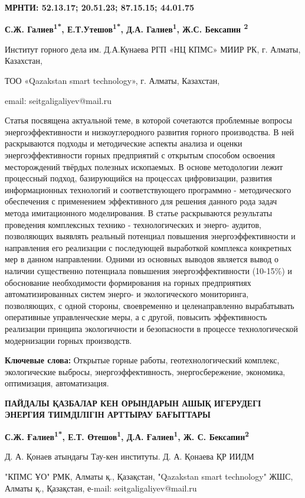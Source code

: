 \clearpage
{\bfseries МРНТИ: 52.13.17; 20.51.23; 87.15.15; 44.01.75}


\begin{center}
{\bfseries С.Ж. Галиев\textsuperscript{1*}, Е.Т.Утешов\textsuperscript{1*},
Д.А. Галиев\textsuperscript{1}, Ж.С. Бексапин \textsuperscript{2}}

Институт горного дела им. Д.А.Кунаева РГП «НЦ КПМС» МИИР РК, г. Алматы,
Казахстан,

ТОО «Qazakstan smart technology», г. Алматы, Казахстан,

email: seitgaligaliyev@mail.ru
\end{center}

Статья посвящена актуальной теме, в которой сочетаются проблемные
вопросы энергоэффективности и низкоуглеродного развития горного
производства. В ней раскрываются подходы и методические аспекты анализа
и оценки энергоэффективности горных предприятий с открытым способом
освоения месторождений твёрдых полезных ископаемых. В основе методологии
лежит процессный подход, базирующийся на процессах цифровизации,
развития информационных технологий и соответствующего
программно - методического обеспечения с применением эффективного для
решения данного рода задач метода имитационного моделирования. В статье
раскрываются результаты проведения комплексных технико - технологических и
энерго- аудитов, позволяющих выявлять реальный потенциал повышения
энергоэффективности и направления его реализации с последующей
выработкой комплекса конкретных мер в данном направлении. Одними из
основных выводов является вывод о наличии существенно потенциала
повышения энергоэффективности (10-15\%) и обоснование необходимости
формирования на горных предприятиях автоматизированных систем энерго- и
экологического мониторинга, позволяющих, с одной стороны, своевременно и
целенаправленно вырабатывать оперативные управленческие меры, а с
другой, повысить эффективность реализации принципа экологичности и
безопасности в процессе технологической модернизации горных производств.

{\bfseries Ключевые слова:} Открытые горные работы, геотехнологический
комплекс, экологические выбросы, энергоэффективность, энергосбережение, экономика,
оптимизация, автоматизация.

\begin{center}
{\large\bfseries ПАЙДАЛЫ ҚАЗБАЛАР КЕН ОРЫНДАРЫН АШЫҚ ИГЕРУДЕГІ ЭНЕРГИЯ
ТИІМДІЛІГІН АРТТЫРАУ БАҒЫТТАРЫ}

{\bfseries С.Ж. Ғалиев\textsuperscript{1*}, Е.Т. Өтешов\textsuperscript{1},
Д.А. Ғалиев\textsuperscript{1}, Ж. С. Бексапин\textsuperscript{2}}

Д. А. Қонаев атындағы Тау-кен институты. Д. А. Қонаева ҚР ИИДМ

"КПМС ҰО" РМК, Алматы қ., Қазақстан, "Qazakstan smart technology" ЖШС,
Алматы қ., Қазақстан,
е-mail: seitgaligaliyev@mail.ru
\end{center}


